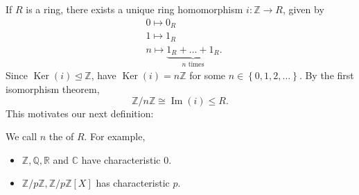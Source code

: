\documentclass[egregdoesnotlikesansseriftitles,a4paper]{scrartcl}
\begin{document}
If $R$ is a ring, there exists a unique ring homomorphism $i: \mathbb{Z} \rightarrow R$, given by 
\begin{align*}
      &0 \mapsto 0_{R}\\
      &1 \mapsto 1_{R}\\
      &n \mapsto \underbrace{1_{R}+\ldots+1_{R}}_{n \text{ times}}.
\end{align*}
Since $\operatorname{Ker}\left(i\right)\unlhd \mathbb{Z}$, have $\operatorname{Ker}\left(i\right)=n\mathbb{Z}$ for some $n \in \left\{0,1,2,\ldots \right\}$. By the first isomorphism theorem, \[
\mathbb{Z}/n\mathbb{Z} \cong \operatorname{Im} \left(i\right) \leq R
.\] This motivates our next definition:
\begin{definition*}[Characteristic]
       We call $n$ the  of $R$. For example,
       \begin{itemize}
             \item $\mathbb{Z},\mathbb{Q},\mathbb{R}$ and $\mathbb{C}$ have characteristic 0. 
             \item $\mathbb{Z}/p\mathbb{Z}, \mathbb{Z}/p\mathbb{Z}[X]$ has characteristic $p$.
       \end{itemize}
\end{definition*}
\newpage
\end{document}
